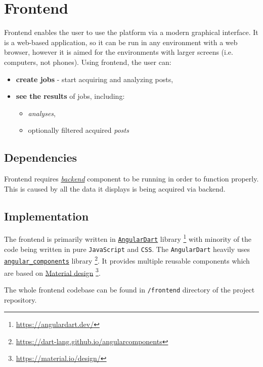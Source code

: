 \section{Frontend}\label{section:frontend}

Frontend enables the user to use the platform via a modern graphical interface. It is a web-based application, so it can be run in any environment with a web browser, however it is aimed for the environments with larger screens (i.e. computers, not phones). Using frontend, the user can:
\begin{itemize}
    \item \textbf{create jobs} - start acquiring and analyzing posts,
    \item \textbf{see the results} of jobs, including:
    \begin{itemize}
        \item \textit{analyses},
        \item optionally filtered acquired \textit{posts}
    \end{itemize}
\end{itemize}

\subsection{Dependencies}
Frontend requires \textit{\href{section:backend}{backend}} component to be running in order to function properly. This is caused by all the data it displays is being acquired via backend.

\subsection{Implementation}
The frontend is primarily written in \texttt{\href{https://angulardart.dev/}{AngularDart}} library \footnote{\url{https://angulardart.dev/}} with minority of the code being written in pure \texttt{JavaScript} and \texttt{CSS}. The \texttt{AngularDart} heavily uses \texttt{\href{https://dart-lang.github.io/angular\_components}{angular\_components}} library \footnote{\url{https://dart-lang.github.io/angularcomponents}}. It provides multiple reusable components which are based on \href{https://material.io/design/}{Material design} \footnote{\url{https://material.io/design/}}.

The whole frontend codebase can be found in \texttt{/frontend} directory of the project repository.

